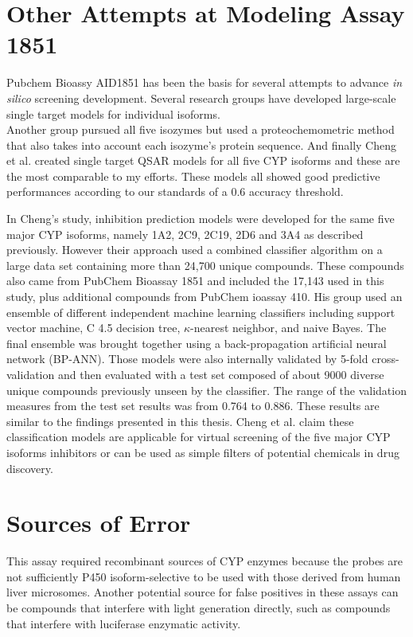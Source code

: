 
\section{Other Attempts at Modeling Assay 1851}
Pubchem Bioassy AID1851 has been the basis for several attempts to advance \textit{in silico} screening development. Several research groups have developed large-scale single target models for individual isoforms. \cite{Vasanthanathan2009} \\\cite{Sridhar2012} \cite{Sun2012} \cite{Novotarskyi2010} Another group pursued all five isozymes but used a proteochemometric method that also takes into account each isozyme's protein sequence. \cite{Lapins2013} And finally Cheng et al. created single target QSAR models for all five CYP isoforms and these are the most comparable to my efforts. \cite{Cheng2011} These models all showed good predictive performances according to our standards of a 0.6 accuracy threshold.

In Cheng's study, inhibition prediction models were developed for the same five major CYP isoforms, namely 1A2, 2C9, 2C19, 2D6 and 3A4 as described previously. However their approach used a combined classifier algorithm on a large data set containing more than 24,700 unique compounds. These compounds also came from PubChem Bioassay 1851 and included the 17,143 used in this study, plus additional compounds from PubChem ioassay 410. His group used an ensemble of different independent machine learning classifiers including support vector machine, C 4.5 decision tree, $\kappa$-nearest neighbor, and naive Bayes. The final ensemble was brought together using a back-propagation artificial neural network (BP-ANN). Those models were also internally validated by 5-fold cross-validation and then evaluated with a test set composed of about 9000 diverse unique compounds previously unseen by the classifier. The range of the validation measures from the test set results was from 0.764 to 0.886. These results are similar to the findings presented in this thesis. Cheng et al. claim these classification models are applicable for virtual screening of the five major CYP isoforms inhibitors or can be used as simple filters of potential chemicals in drug discovery. \cite{Cheng2011}


\section{Sources of Error}
This assay required recombinant sources of CYP enzymes because the probes are not sufficiently P450 isoform-selective to be used with those derived from human liver microsomes. Another potential source for false positives in these assays can be compounds that interfere with light generation directly, such as compounds that interfere with luciferase enzymatic activity. \cite{Zlokarnik2005}

